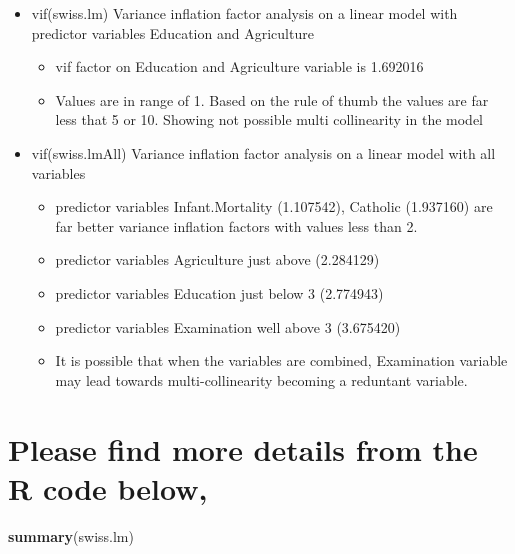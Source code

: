 \documentclass[]{article}
\newenvironment{Shaded}{\begin{snugshade}}{\end{snugshade}}
\newcommand{\KeywordTok}[1]{\textcolor[rgb]{0.13,0.29,0.53}{\textbf{#1}}}
\newcommand{\NormalTok}[1]{#1}
\providecommand{\tightlist}{%
  \setlength{\itemsep}{0pt}\setlength{\parskip}{0pt}}
\begin{document}
\begin{itemize}
\tightlist
\item
  vif(swiss.lm) \textbar{} Variance inflation factor analysis on a
  linear model with predictor variables Education and Agriculture

  \begin{itemize}
  \tightlist
  \item
    vif factor on Education and Agriculture variable is 1.692016
  \item
    Values are in range of 1. Based on the rule of thumb the values are
    far less that 5 or 10. Showing not possible multi collinearity in
    the model
  \end{itemize}
\item
  vif(swiss.lmAll) \textbar{} Variance inflation factor analysis on a
  linear model with all variables

  \begin{itemize}
  \tightlist
  \item
    predictor variables Infant.Mortality (1.107542), Catholic (1.937160)
    are far better variance inflation factors with values less than 2.
  \item
    predictor variables Agriculture just above (2.284129)
  \item
    predictor variables Education just below 3 (2.774943)
  \item
    predictor variables Examination well above 3 (3.675420)
  \item
    It is possible that when the variables are combined, Examination
    variable may lead towards multi-collinearity becoming a reduntant
    variable.
  \end{itemize}
\end{itemize}

\hypertarget{please-find-more-details-from-the-r-code-below-6}{%
\section{Please find more details from the R code
below,}\label{please-find-more-details-from-the-r-code-below-6}}

\begin{Shaded}
\begin{Highlighting}[]
\KeywordTok{summary}\NormalTok{(swiss.lm)}
\end{Highlighting}
\end{Shaded}
\end{document}
